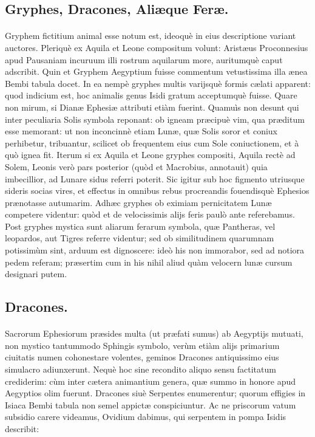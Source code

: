 \documentclass[a4paper, 11pt, oneside, polutonikogreek, latin]{article}
\begin{document}
\subsection{Gryphes, Dracones, Aliæque Feræ.}
\paragraph{}
Gryphem fictitium animal esse notum est, ideoquè in eius descriptione variant auctores. Pleriquè ex Aquila et Leone compositum volunt: Aristæus Proconnesius apud Pausaniam incuruum illi rostrum aquilarum more, auritumquè caput adscribit. Quin et Gryphem Aegyptium fuisse commentum vetustissima illa ænea Bembi tabula docet. In ea nempè gryphes multis varijsquè formis cælati apparent: quod indicium est, hoc animalis genus Isidi gratum acceptumquè fuisse. Quare non mirum, si Dianæ Ephesiæ attributi etiàm fuerint. Quamuìs non desunt qui inter peculiaria Solis symbola reponant: ob igneam præcipuè vim, qua præditum esse memorant: ut non inconcinnè etiam Lunæ, quæ Solis soror et coniux perhibetur, tribuantur, scilicet ob frequentem eius cum Sole coniuctionem, et à quò ignea fit. Iterum si ex Aquila et Leone gryphes compositi, Aquila rectè ad Solem, Leonis verò pars posterior (quòd et Macrobius, annotauit) quia imbecillior, ad Lunare sidus referri poterit. Sic igitur sub hoc figmento utriusque sideris socias vires, et effectus in omnibus rebus procreandis fouendisquè Ephesios prænotasse autumarim. Adhæc gryphes ob eximiam pernicitatem Lunæ competere videntur: quòd et de velocissimis alijs feris paulò ante referebamus. Post gryphes mystica sunt aliarum ferarum symbola, quæ Pantheras, vel leopardos, aut Tigres referre videntur; sed ob similitudinem quarumnam potissimùm sint, arduum est dignoscere: ideò his non immorabor, sed ad notiora pedem referam; præsertim cum in his nihil aliud quàm velocern lunæ cursum designari putem.
\clearpage
\subsection{Dracones.}
\paragraph{}
Sacrorum Ephesiorum præsides multa (ut præfati sumus) ab Aegyptijs mutuati, non mystico tantummodo Sphingis symbolo, verùm etiàm alijs primarium ciuitatis numen cohonestare volentes, geminos Dracones antiquissimo eius simulacro adiunxerunt. Nequè hoc sine recondito aliquo sensu factitatum crediderim: cùm inter cætera animantium genera, quæ summo in honore apud Aegyptios olim fuerunt. Dracones siuè Serpentes enumerentur; quorum effigies in Isiaca Bembi tabula non semel appictæ conspiciuntur. Ac ne priscorum vatum subsidio carere videamus, Ovidium dabimus, qui serpentem in pompa Isidis describit:
\end{document}
